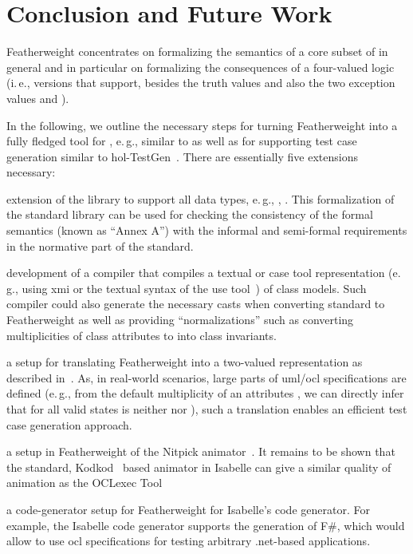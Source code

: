 \documentclass[11pt,a4paper,openright,twoside,abstracton]{scrreprt}
\newcommand{\ie}{i.\,e.\xspace}
\newcommand{\eg}{e.\,g.\xspace}
\begin{document}
\section{Conclusion and Future Work}
Featherweight \OCL concentrates on formalizing the semantics of a core
subset of \OCL in general and in particular on formalizing the
consequences of a four-valued logic (\ie, \OCL versions that support,
besides the truth values  and  also
the two exception values  and ).

In the following, we outline the necessary steps for turning
Featherweight \OCL into a fully fledged tool for \OCL, \eg, similar to
\holocl as well as for supporting test case generation similar to
\acs{hol}-TestGen~\cite{brucker.ea:hol-testgen:2009}.  There are
essentially five extensions necessary:
\begin{compactitem}
\item extension of  the library to support all \OCL data types, \eg,
  , . %
  This formalization of the \OCL standard library can be used for
  checking the consistency of the formal semantics (known as ``Annex
  A'') with the informal and semi-formal requirements in the normative
  part of the \OCL standard.
\item development of a compiler that compiles a textual or \acs{case}
  tool representation (\eg, using \acs{xmi} or the textual syntax of
  the \acs{use} tool~\cite{richters:precise:2002}) of class
  models. Such compiler could also generate the necessary casts when
  converting standard \OCL to Featherweight \OCL as well as providing
  ``normalizations'' such as converting multiplicities of class
  attributes to into \OCL class invariants.
\item a setup for translating Featherweight \OCL into a two-valued
  representation as described
  in~\cite{brucker.ea:ocl-testing:2010}. As, in real-world scenarios,
  large parts of \acs{uml}/\acs{ocl} specifications are defined (\eg,
  from the default multiplicity  of an attributes
  , we can directly infer that for all valid states
   is neither  nor ),
  such a translation enables an efficient test case generation
  approach.
\item a setup in Featherweight \OCL of the Nitpick
  animator~\cite{blanchette.ea:nitpick:2010}. It remains to be shown
  that the standard, Kodkod~\cite{torlak.ea:kodkod:2007} based
  animator in Isabelle can give a similar quality of animation as the
  OCLexec Tool~\cite{krieger.ea:generative:2010}
\item a code-generator setup for Featherweight \OCL for Isabelle's
  code generator. For example, the Isabelle code generator supports
  the generation of F\#, which would allow to use \acs{ocl}
  specifications for testing arbitrary .net-based applications.
\end{compactitem}
\end{document}
